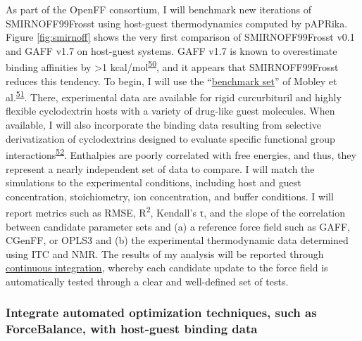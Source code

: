 \documentclass[11pt,notitlepage]{article}
\begin{document}
As part of the OpenFF consortium, I will benchmark new iterations of
SMIRNOFF99Frosst using host-guest thermodynamics computed by pAPRika.
Figure \ref{fig:smirnoff} shows the very first comparison of
SMIRNOFF99Frosst v0.1 and GAFF v1.7 on host-guest systems. GAFF v1.7 is
known to overestimate binding affinities by \textgreater{}1
kcal/mol\textsuperscript{\protect\hyperlink{ref-HVgz5rZq}{50}}, and it
appears that SMIRNOFF99Frosst reduces this tendency. To begin, I will
use the ``\href{https://escholarship.org/uc/item/9p37m6bq}{benchmark
set}'' of Mobley et
al.\textsuperscript{\protect\hyperlink{ref-12BD3oHp4}{51}}. There,
experimental data are available for rigid curcurbituril and highly
flexible cyclodextrin hosts with a variety of drug-like guest molecules.
When available, I will also incorporate the binding data resulting from
selective derivatization of cyclodextrins designed to evaluate specific
functional group
interactions\textsuperscript{\protect\hyperlink{ref-13gqBX78S}{52}}.
Enthalpies are poorly correlated with free energies, and thus, they
represent a nearly independent set of data to compare. I will match the
simulations to the experimental conditions, including host and guest
concentration, stoichiometry, ion concentration, and buffer conditions.
I will report metrics such as RMSE, R\textsuperscript{2}, Kendall's τ,
and the slope of the correlation between candidate parameter sets and
(a) a reference force field such as GAFF, CGenFF, or OPLS3 and (b) the
experimental thermodynamic data determined using ITC and NMR. The
results of my analysis will be reported through
\href{https://travis-ci.org/openforcefield/openforcefield?branch=master}{continuous
integration}, whereby each candidate update to the force field is
automatically tested through a clear and well-defined set of tests.

\hypertarget{integrate-automated-optimization-techniques-such-as-forcebalance-with-host-guest-binding-data}{%
\subsubsection{Integrate automated optimization techniques, such as
ForceBalance, with host-guest binding
data}\label{integrate-automated-optimization-techniques-such-as-forcebalance-with-host-guest-binding-data}}
\end{document}
